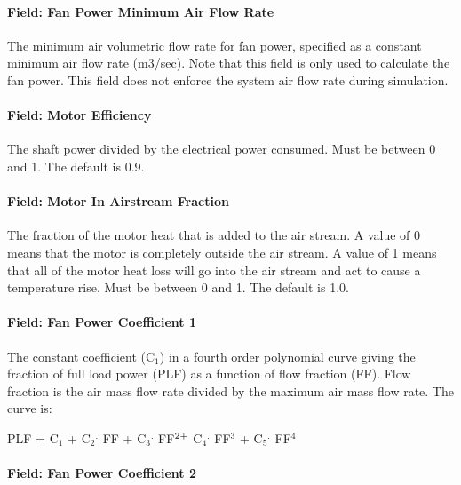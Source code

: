 \paragraph{Field: Fan Power Minimum Air Flow Rate}\label{field-fan-power-minimum-air-flow-rate}

The minimum air volumetric flow rate for fan power, specified as a constant minimum air flow rate (m3/sec). Note that this field is only used to calculate the fan power. This field does not enforce the system air flow rate during simulation.

\paragraph{Field: Motor Efficiency}\label{field-motor-efficiency-2}

The shaft power divided by the electrical power consumed. Must be between 0 and 1. The default is 0.9.

\paragraph{Field: Motor In Airstream Fraction}\label{field-motor-in-airstream-fraction-2}

The fraction of the motor heat that is added to the air stream. A value of 0 means that the motor is completely outside the air stream. A value of 1 means that all of the motor heat loss will go into the air stream and act to cause a temperature rise. Must be between 0 and 1. The default is 1.0.

\paragraph{Field: Fan Power Coefficient 1}\label{field-fan-power-coefficient-1}

The constant coefficient (C\(_{1}\)) in a fourth order polynomial curve giving the fraction of full load power (PLF) as a function of flow fraction (FF). Flow fraction is the air mass flow rate divided by the maximum air mass flow rate. The curve is:

PLF = C\(_{1}\) + C\(_{2}\)\(^{.}\) FF + C\(_{3}\)\(^{.}\) FF\(^{2\\ +}\) C\(_{4}\)\(^{.}\) FF\(^{3}\) + C\(_{5}\)\(^{.}\) FF\(^{4}\)

\paragraph{Field: Fan Power Coefficient 2}\label{field-fan-power-coefficient-2}

